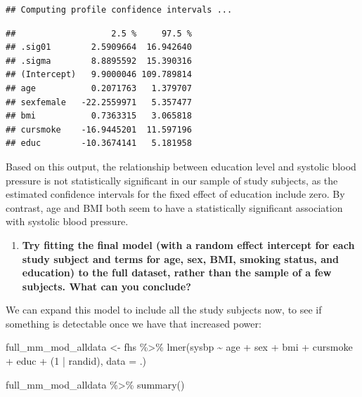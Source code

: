 \documentclass[
]{book}
\newenvironment{Shaded}{\begin{snugshade}}{\end{snugshade}}
\newcommand{\AttributeTok}[1]{\textcolor[rgb]{0.77,0.63,0.00}{#1}}
\newcommand{\DecValTok}[1]{\textcolor[rgb]{0.00,0.00,0.81}{#1}}
\newcommand{\FunctionTok}[1]{\textcolor[rgb]{0.00,0.00,0.00}{#1}}
\newcommand{\NormalTok}[1]{#1}
\newcommand{\OtherTok}[1]{\textcolor[rgb]{0.56,0.35,0.01}{#1}}
\newcommand{\SpecialCharTok}[1]{\textcolor[rgb]{0.00,0.00,0.00}{#1}}
\providecommand{\tightlist}{%
  \setlength{\itemsep}{0pt}\setlength{\parskip}{0pt}}
\begin{document}
\begin{verbatim}
## Computing profile confidence intervals ...
\end{verbatim}

\begin{verbatim}
##                   2.5 %     97.5 %
## .sig01        2.5909664  16.942640
## .sigma        8.8895592  15.390316
## (Intercept)   9.9000046 109.789814
## age           0.2071763   1.379707
## sexfemale   -22.2559971   5.357477
## bmi           0.7363315   3.065818
## cursmoke    -16.9445201  11.597196
## educ        -10.3674141   5.181958
\end{verbatim}

Based on this output, the relationship between education level and systolic
blood pressure is not statistically significant in our sample of study subjects,
as the estimated confidence intervals for the fixed effect of education include
zero. By contrast, age and BMI both seem to have a statistically significant
association with systolic blood pressure.

\begin{enumerate}
\def\labelenumi{\arabic{enumi}.}
\setcounter{enumi}{3}
\tightlist
\item
  \textbf{Try fitting the final model (with a random effect intercept for each study
  subject and terms for age, sex, BMI, smoking status, and education) to the
  full dataset, rather than the sample of a few subjects. What can you conclude?}
\end{enumerate}

We can expand this model to include all the study subjects now, to see if
something is detectable once we have that increased power:

\begin{Shaded}
\begin{Highlighting}[]
\NormalTok{full\_mm\_mod\_alldata }\OtherTok{\textless{}{-}}\NormalTok{ fhs }\SpecialCharTok{\%\textgreater{}\%} 
  \FunctionTok{lmer}\NormalTok{(sysbp }\SpecialCharTok{\textasciitilde{}}\NormalTok{ age }\SpecialCharTok{+}\NormalTok{ sex }\SpecialCharTok{+}\NormalTok{ bmi }\SpecialCharTok{+}\NormalTok{ cursmoke }\SpecialCharTok{+}\NormalTok{ educ }\SpecialCharTok{+}\NormalTok{ (}\DecValTok{1} \SpecialCharTok{|}\NormalTok{ randid), }
       \AttributeTok{data =}\NormalTok{ .) }

\NormalTok{full\_mm\_mod\_alldata }\SpecialCharTok{\%\textgreater{}\%} 
  \FunctionTok{summary}\NormalTok{()}
\end{Highlighting}
\end{Shaded}
\end{document}
